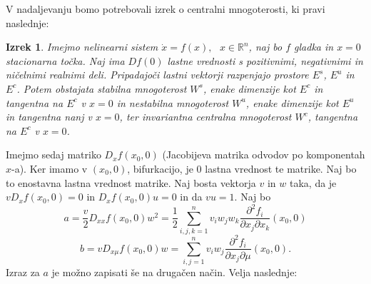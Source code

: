 \documentclass[a4paper,12pt]{article}
\newtheorem{izrek}{Izrek}
\begin{document}
V nadaljevanju bomo potrebovali izrek o centralni mnogoterosti, ki pravi naslednje:
\begin{izrek}
    Imejmo nelinearni sistem \(\dot{x}=f(x),\textrm{ }x\in\mathbb{R}^n\), naj bo \(f\) gladka 
    in \(x=0\) stacionarna točka. Naj ima \(Df(0)\) lastne vrednosti s pozitivnimi, negativnimi in 
    ničelnimi realnimi deli. Pripadajoči lastni vektorji razpenjajo prostore \(E^s\), \(E^u\) in \(E^c\). 
    Potem obstajata stabilna mnogoterost \(W^s\), enake dimenzije kot \(E^c\) in tangentna na \(E^c\) v \(x=0\) in nestabilna mnogoterost \(W^u\),
    enake dimenzije kot \(E^u\) in tangentna nanj v \(x=0\), ter invariantna centralna mnogoterost \(W^c\), 
    tangentna na \(E^c\) v \(x=0\).{}
\end{izrek}

Imejmo sedaj matriko \(D_xf(x_0,0)\) (Jacobijeva matrika odvodov po komponentah \(x\)-a). 
Ker imamo v \((x_0,0)\), bifurkacijo, je \(0\) lastna vrednost te matrike. Naj bo 
to enostavna lastna vrednost matrike. Naj bosta vektorja \(v\) in \(w\) taka, da je 
\(vD_xf(x_0,0)=0\) in \(D_xf(x_0,0)u=0\) in da \(vu=1\).
Naj bo 
\begin{equation}\label{eq5}
a=\frac{v}{2}D_{xx}f(x_0,0)w^2=\frac{1}{2}\sum_{i,j,k=1}^n v_iw_jw_k\frac{\partial^2f_i}{\partial x_j \partial x_k}(x_0,0)
\end{equation}
\[b=vD_{x\mu}f(x_0,0)w=\sum_{i,j=1}^n v_i w_j \frac{\partial^2 f_i}{\partial x_j \partial \mu}(x_0,0).\]
Izraz za \(a\) je možno zapisati še na drugačen način. Velja naslednje:
\end{document}
